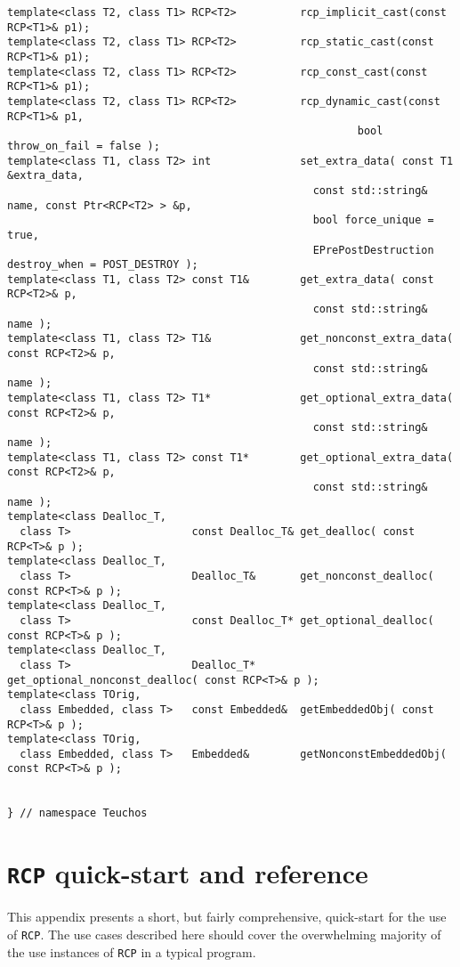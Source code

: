 \documentclass[pdf,ps2pdf,11pt]{SANDreport}
\begin{document}
{\scriptsize\begin{verbatim}
template<class T2, class T1> RCP<T2>          rcp_implicit_cast(const RCP<T1>& p1);
template<class T2, class T1> RCP<T2>          rcp_static_cast(const RCP<T1>& p1);
template<class T2, class T1> RCP<T2>          rcp_const_cast(const RCP<T1>& p1);
template<class T2, class T1> RCP<T2>          rcp_dynamic_cast(const RCP<T1>& p1,
                                                       bool throw_on_fail = false );
template<class T1, class T2> int              set_extra_data( const T1 &extra_data,
                                                const std::string& name, const Ptr<RCP<T2> > &p,
                                                bool force_unique = true,
                                                EPrePostDestruction destroy_when = POST_DESTROY );
template<class T1, class T2> const T1&        get_extra_data( const RCP<T2>& p,
                                                const std::string& name );
template<class T1, class T2> T1&              get_nonconst_extra_data( const RCP<T2>& p,
                                                const std::string& name );
template<class T1, class T2> T1*              get_optional_extra_data( const RCP<T2>& p,
                                                const std::string& name );
template<class T1, class T2> const T1*        get_optional_extra_data( const RCP<T2>& p,
                                                const std::string& name );
template<class Dealloc_T,
  class T>                   const Dealloc_T& get_dealloc( const RCP<T>& p );
template<class Dealloc_T,
  class T>                   Dealloc_T&       get_nonconst_dealloc( const RCP<T>& p );
template<class Dealloc_T,
  class T>                   const Dealloc_T* get_optional_dealloc( const RCP<T>& p );
template<class Dealloc_T,
  class T>                   Dealloc_T*       get_optional_nonconst_dealloc( const RCP<T>& p );
template<class TOrig,
  class Embedded, class T>   const Embedded&  getEmbeddedObj( const RCP<T>& p );
template<class TOrig,
  class Embedded, class T>   Embedded&        getNonconstEmbeddedObj( const RCP<T>& p );


} // namespace Teuchos
\end{verbatim}}

%
\section{\texttt{RCP} quick-start and reference}
\label{rcpqs:apdx:quickstart}
%

This appendix presents a short, but fairly comprehensive, quick-start
for the use of {}\texttt{RCP}.  The use cases described
here should cover the overwhelming majority of the use instances of
{}\texttt{RCP} in a typical program.
\end{document}

